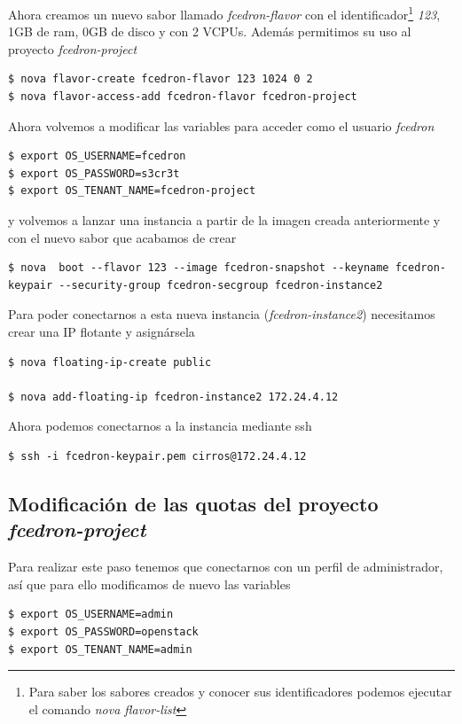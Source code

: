 \documentclass{article}
\begin{document}
	Ahora creamos un nuevo sabor llamado \emph{fcedron-flavor} con el identificador\footnote{
Para saber los sabores creados y conocer sus identificadores podemos ejecutar el comando \emph{nova flavor-list}	
} \emph{123}, 1GB de ram, 0GB de disco y con 2 VCPUs. Además permitimos su uso al proyecto \emph{fcedron-project}
\begin{lstlisting}[style=miniBash]
$ nova flavor-create fcedron-flavor 123 1024 0 2
$ nova flavor-access-add fcedron-flavor fcedron-project
\end{lstlisting}

	Ahora volvemos a modificar las variables para acceder como el usuario \emph{fcedron}
\begin{lstlisting}[style=miniBash]
$ export OS_USERNAME=fcedron
$ export OS_PASSWORD=s3cr3t
$ export OS_TENANT_NAME=fcedron-project
\end{lstlisting}
	y volvemos a lanzar una instancia a partir de la imagen creada anteriormente y con el nuevo sabor que acabamos de crear
\begin{lstlisting}[style=miniBash]
$ nova  boot --flavor 123 --image fcedron-snapshot --keyname fcedron-keypair --security-group fcedron-secgroup fcedron-instance2
\end{lstlisting}

	Para poder conectarnos a esta nueva instancia (\emph{fcedron-instance2}) necesitamos crear una IP flotante y asignársela
\begin{lstlisting}[style=miniBash]
$ nova floating-ip-create public

$ nova add-floating-ip fcedron-instance2 172.24.4.12
\end{lstlisting}

	Ahora podemos conectarnos a la instancia mediante ssh
\begin{lstlisting}[style=miniBash]
$ ssh -i fcedron-keypair.pem cirros@172.24.4.12
\end{lstlisting}

\subsection{Modificación de las quotas del proyecto \emph{fcedron-project}}
	Para realizar este paso tenemos que conectarnos con un perfil de administrador, así que para ello modificamos de nuevo las variables
\begin{lstlisting}[style=miniBash]
$ export OS_USERNAME=admin
$ export OS_PASSWORD=openstack
$ export OS_TENANT_NAME=admin
\end{lstlisting}
\end{document}
